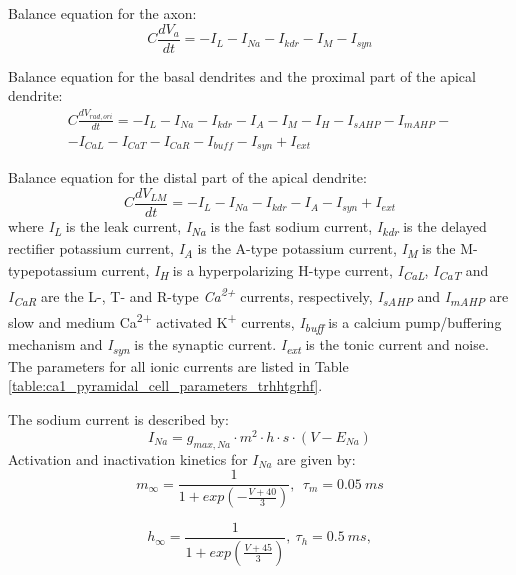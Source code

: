 \documentclass[a4paper,12pt]{article}
\begin{document}
Balance equation for the axon:
\begin{equation}
C\frac{dV_a}{dt}=-I_L-I_{Na}-I_{kdr}-I_M-I_{syn}
\end{equation}

Balance equation for the basal dendrites and the proximal part of the apical dendrite:
\begin{eqnarray}
C\frac{dV_{rad,ori}}{dt} =-I_L-I_{Na}-I_{kdr}-I_A-I_M-I_H-I_{sAHP}-I_{mAHP}- \nonumber \\-I_{CaL}-I_{CaT}-I_{CaR}-I_{buff}-I_{syn}+I_{ext}
\end{eqnarray}

Balance equation for the distal part of the apical dendrite:
\begin{equation}
C\frac{dV_{LM}}{dt}=-I_L-I_{Na}-I_{kdr}-I_A-I_{syn}+I_{ext}
\end{equation}
where \textit{I\textsubscript{L}} is the leak current,  \textit{I\textsubscript{Na}} is the fast sodium current, \textit{I\textsubscript{kdr}} is the delayed rectifier potassium current, \textit{I\textsubscript{A}} is the A-type potassium current, \textit{I\textsubscript{M}}
is the M-typepotassium current, \textit{I\textsubscript{H}} is a hyperpolarizing H-type current,
\textit{I\textsubscript{CaL}}, \textit{I\textsubscript{CaT}} and
\textit{I\textsubscript{CaR}} are the L-, T- and R-type \textit{Ca\textsuperscript{2+}} currents, respectively,
\textit{I\textsubscript{sAHP}} and \textit{I\textsubscript{mAHP}} are
slow and medium Ca\textsuperscript{2+} activated K\textsuperscript{+} currents,\textit{ I\textsubscript{buff}}
is a calcium pump/buffering mechanism and \textit{I\textsubscript{syn}} is the synaptic current. \textit{ I\textsubscript{ext}} is the tonic current and noise. The
parameters for all ionic currents are listed in Table \ref{table:ca1_pyramidal_cell_parameters_trhhtgrhf}. \par
The sodium current is described by:
\begin{equation}
I_{Na}= g_{max, Na}\cdot m^2\cdot h\cdot s\cdot (V-E_{Na})
\end{equation}
Activation and inactivation kinetics for ${I_{Na}}$ are given by:
\begin{equation}
m_{\infty}=\frac {1}{1+exp(-\frac{V+40} {3})} , \ \ \tau_m=0.05 \ ms
\end{equation}

\begin{equation}
h_{\infty}=\frac {1}{1+exp(\frac{V+45}{3})},  \  \tau_h = 0.5 \ ms,
\end{equation}
\end{document}
